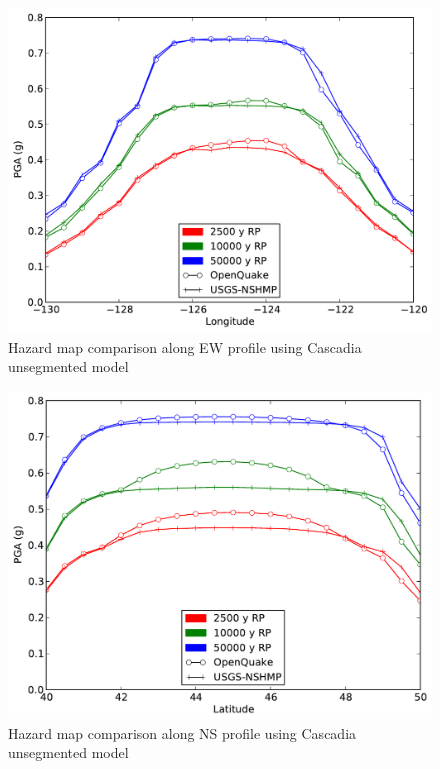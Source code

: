 \begin{figure}
\centering
\includegraphics[width=12cm]{./qareport/pictures/cascadia_float_oq_nshmp_ew.pdf}
\caption{Hazard map comparison along EW profile using Cascadia unsegmented model}
\label{fig:cascadia_float_ew}
\end{figure}
\begin{figure}
\centering
\includegraphics[width=12cm]{./qareport/pictures/cascadia_float_oq_nshmp_ns.pdf}
\caption{Hazard map comparison along NS profile using Cascadia unsegmented model}
\label{fig:cascadia_float_ns}
\end{figure}
